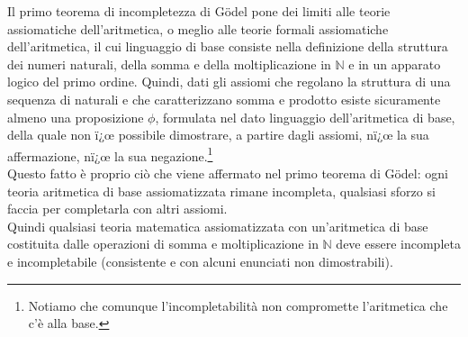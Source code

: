Il primo teorema di incompletezza di G\"odel pone dei limiti alle teorie assiomatiche dell'aritmetica, o meglio alle teorie formali assiomatiche dell'aritmetica, il cui linguaggio di base consiste nella definizione della struttura dei numeri naturali, della somma e della moltiplicazione in $\mathbb{N}$ e in un apparato logico del primo ordine.\newline
Quindi, dati gli assiomi che regolano la struttura di una sequenza di naturali e che caratterizzano somma e prodotto esiste sicuramente almeno una proposizione $\phi$, formulata nel dato linguaggio dell'aritmetica di base, della quale non ï¿œ possibile dimostrare, a partire dagli assiomi, nï¿œ la sua affermazione, nï¿œ la sua negazione.\footnote{Notiamo che comunque l'incompletabilit\`a non compromette l'aritmetica che c'\`e alla base.}\\
Questo fatto \`e proprio ci\`o che viene affermato nel primo teorema di G\"odel: ogni teoria aritmetica di base assiomatizzata rimane incompleta, qualsiasi sforzo si faccia per completarla con altri assiomi.\\
Quindi qualsiasi teoria matematica assiomatizzata con un'aritmetica di base costituita dalle operazioni di somma e moltiplicazione in $\mathbb{N}$ deve essere incompleta e incompletabile (consistente e con alcuni enunciati non dimostrabili).

